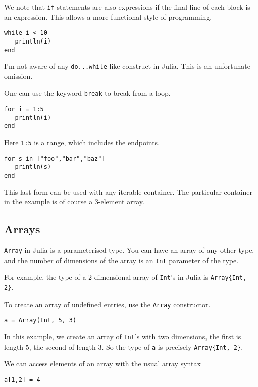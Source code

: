 \documentclass[a4paper,10pt]{article}
\newcommand{\code}{\lstinline}
\begin{document}
{We note that \code{if} statements are also expressions if the final line of each block is an expression.
This allows a more functional style of programming.

\begin{lstlisting}
while i < 10
   println(i)
end
\end{lstlisting}

I'm not aware of any \code{do...while} like construct in Julia. This is an unfortunate omission.

One can use the keyword \code{break} to break from a loop.

\begin{lstlisting}
for i = 1:5
   println(i)
end
\end{lstlisting}

Here \code{1:5} is a range, which includes the endpoints.

\begin{lstlisting}
for s in ["foo","bar","baz"]
   println(s)
end
\end{lstlisting}

This last form can be used with any iterable container. The particular container in the example is
of course a 3-element array.

\subsection{Arrays}

\code{Array} in Julia is a parameterised type. You can have an array of any other type, and the 
number of dimensions of the array is an \code{Int} parameter of the type.

For example, the type of a 2-dimensional array of \code{Int}'s in Julia is \code|Array{Int, 2}|.

To create an array of undefined entries, use the \code{Array} constructor.

\begin{lstlisting}
a = Array(Int, 5, 3)
\end{lstlisting}

In this example, we create an array of \code{Int}'s with two dimensions, the first is length $5$,
the second of length $3$. So the type of \code{a} is precisely \code|Array{Int, 2}|.

We can access elements of an array with the usual array syntax

\begin{lstlisting}
a[1,2] = 4
\end{lstlisting}

}
\end{document}
